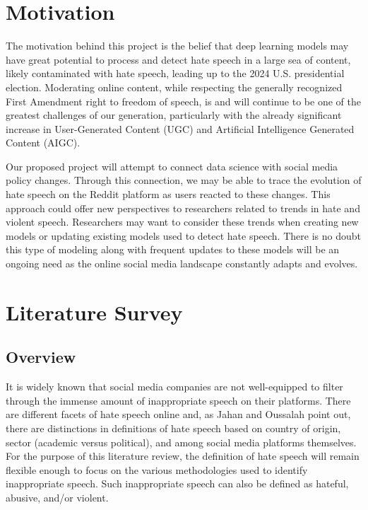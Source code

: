 \documentclass[conference]{IEEEtran}
\begin{document}
\section{Motivation}
The motivation behind this project is the belief that deep learning models may have great potential to process and detect hate speech in a large sea of content, likely contaminated with hate speech, leading up to the 2024 U.S. presidential election. Moderating online content, while respecting the generally recognized First Amendment right to freedom of speech, is and will continue to be one of the greatest challenges of our generation, particularly with the already significant increase in User-Generated Content (UGC) and Artificial Intelligence Generated Content (AIGC).

Our proposed project will attempt to connect data science with social media policy changes. Through this connection, we may be able to trace the evolution of hate speech on the Reddit platform as users reacted to these changes. This approach could offer new perspectives to researchers related to trends in hate and violent speech. Researchers may want to consider these trends when creating new models or updating existing models used to detect hate speech. There is no doubt this type of modeling along with frequent updates to these models will be an ongoing need as the online social media landscape constantly adapts and evolves.

\section{Literature Survey}

\subsection{Overview}
It is widely known that social media companies are not well-equipped to filter through the immense amount of inappropriate speech on their platforms. There are different facets of hate speech online and, as Jahan and Oussalah\cite{b7} point out, there are distinctions in definitions of hate speech based on country of origin, sector (academic versus political), and among social media platforms themselves. For the purpose of this literature review, the definition of hate speech will remain flexible enough to focus on the various methodologies used to identify inappropriate speech. Such inappropriate speech can also be defined as hateful, abusive, and/or violent.
\end{document}
